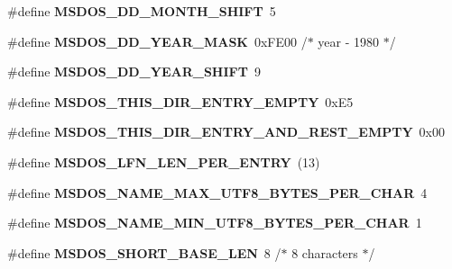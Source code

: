 \begin{DoxyCompactItemize}
\#define {\bfseries M\+S\+D\+O\+S\+\_\+\+D\+D\+\_\+\+M\+O\+N\+T\+H\+\_\+\+S\+H\+I\+FT}~5
\item 
\mbox{\label{group__libfs__msdos_ga46de8a9ba3171029520c5d9230b413a9}} 
\#define {\bfseries M\+S\+D\+O\+S\+\_\+\+D\+D\+\_\+\+Y\+E\+A\+R\+\_\+\+M\+A\+SK}~0x\+F\+E00  /$\ast$ year -\/ 1980 $\ast$/
\item 
\mbox{\label{group__libfs__msdos_ga5918d41792cb1ca36fa15bf73b886bbd}} 
\#define {\bfseries M\+S\+D\+O\+S\+\_\+\+D\+D\+\_\+\+Y\+E\+A\+R\+\_\+\+S\+H\+I\+FT}~9
\item 
\mbox{\label{group__libfs__msdos_gaefd6f76828feb1f5c476f9d674aca179}} 
\#define {\bfseries M\+S\+D\+O\+S\+\_\+\+T\+H\+I\+S\+\_\+\+D\+I\+R\+\_\+\+E\+N\+T\+R\+Y\+\_\+\+E\+M\+P\+TY}~0x\+E5
\item 
\mbox{\label{group__libfs__msdos_ga08006a6642ca4f1161eb43d76754f2d3}} 
\#define {\bfseries M\+S\+D\+O\+S\+\_\+\+T\+H\+I\+S\+\_\+\+D\+I\+R\+\_\+\+E\+N\+T\+R\+Y\+\_\+\+A\+N\+D\+\_\+\+R\+E\+S\+T\+\_\+\+E\+M\+P\+TY}~0x00
\item 
\mbox{\label{group__libfs__msdos_gad2ade12f9606b945f66262465fc4611a}} 
\#define {\bfseries M\+S\+D\+O\+S\+\_\+\+L\+F\+N\+\_\+\+L\+E\+N\+\_\+\+P\+E\+R\+\_\+\+E\+N\+T\+RY}~(13)
\item 
\mbox{\label{group__libfs__msdos_ga43ecb79b330c3cc79cb2759ee7b9d44d}} 
\#define {\bfseries M\+S\+D\+O\+S\+\_\+\+N\+A\+M\+E\+\_\+\+M\+A\+X\+\_\+\+U\+T\+F8\+\_\+\+B\+Y\+T\+E\+S\+\_\+\+P\+E\+R\+\_\+\+C\+H\+AR}~4
\item 
\mbox{\label{group__libfs__msdos_ga960e40ea7c62b0439fadb8e9bf368acb}} 
\#define {\bfseries M\+S\+D\+O\+S\+\_\+\+N\+A\+M\+E\+\_\+\+M\+I\+N\+\_\+\+U\+T\+F8\+\_\+\+B\+Y\+T\+E\+S\+\_\+\+P\+E\+R\+\_\+\+C\+H\+AR}~1
\item 
\mbox{\label{group__libfs__msdos_ga31fc2b031401ca743062948a1706d4e7}} 
\#define {\bfseries M\+S\+D\+O\+S\+\_\+\+S\+H\+O\+R\+T\+\_\+\+B\+A\+S\+E\+\_\+\+L\+EN}~8  /$\ast$ 8 characters $\ast$/
\item 
\mbox{\label{group__libfs__msdos_ga93f19ad2f88c7577f0db8b7003d68d93}} 

\end{DoxyCompactItemize}
